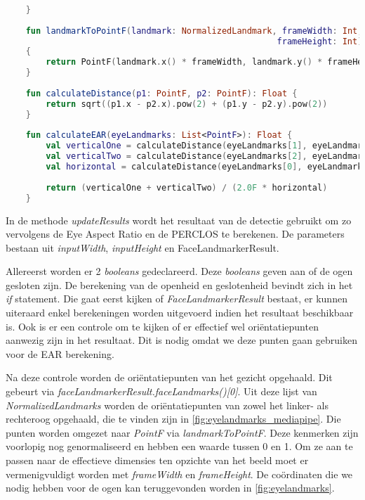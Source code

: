 \begin{lstlisting}[language=Kotlin, caption=PERCLOS en EAR berekenen, label={lst:updateResults}]
        
    }
    
    fun landmarkToPointF(landmark: NormalizedLandmark, frameWidth: Int, 
                                                      frameHeight: Int): PointF
    {
        return PointF(landmark.x() * frameWidth, landmark.y() * frameHeight)
    }
    
    fun calculateDistance(p1: PointF, p2: PointF): Float {
        return sqrt((p1.x - p2.x).pow(2) + (p1.y - p2.y).pow(2))
    }
    
    fun calculateEAR(eyeLandmarks: List<PointF>): Float {
        val verticalOne = calculateDistance(eyeLandmarks[1], eyeLandmarks[5])
        val verticalTwo = calculateDistance(eyeLandmarks[2], eyeLandmarks[4])
        val horizontal = calculateDistance(eyeLandmarks[0], eyeLandmarks[3])
        
        return (verticalOne + verticalTwo) / (2.0F * horizontal)
    }
\end{lstlisting}
In de methode \emph{updateResults} wordt het resultaat van de detectie gebruikt om zo vervolgens de Eye Aspect Ratio en de PERCLOS te berekenen. De parameters bestaan uit \emph{inputWidth}, \emph{inputHeight} en {FaceLandmarkerResult}.

Allereerst worden er 2 \emph{booleans} gedeclareerd. Deze \emph{booleans} geven aan of de ogen gesloten zijn. De berekening van de openheid en geslotenheid bevindt zich in het \emph{if} statement. Die gaat eerst kijken of \emph{FaceLandmarkerResult} bestaat, er kunnen uiteraard enkel berekeningen worden uitgevoerd indien het resultaat beschikbaar is. Ook is er een controle om te kijken of er effectief wel oriëntatiepunten aanwezig zijn in het resultaat. Dit is nodig omdat we deze punten gaan gebruiken voor de EAR berekening. 

Na deze controle worden de oriëntatiepunten van het gezicht opgehaald. Dit gebeurt via \emph{faceLandmarkerResult.faceLandmarks()[0]}. Uit deze lijst van \emph{NormalizedLandmarks} worden de oriëntatiepunten van zowel het linker- als rechteroog opgehaald, die te vinden zijn in \ref{fig:eyelandmarks_mediapipe}. Die punten worden omgezet naar \emph{PointF} via \emph{landmarkToPointF}. Deze kenmerken zijn voorlopig nog genormaliseerd en hebben een waarde tussen 0 en 1. Om ze aan te passen naar de effectieve dimensies ten opzichte van het beeld moet er vermenigvuldigt worden met \emph{frameWidth} en \emph{frameHeight}. De coördinaten die we nodig hebben voor de ogen kan teruggevonden worden in \ref{fig:eyelandmarks}.

